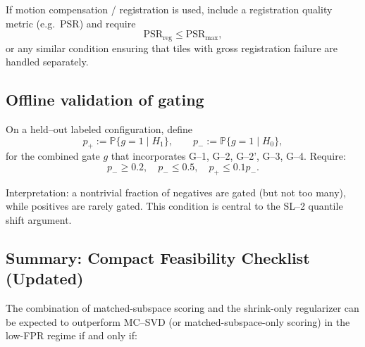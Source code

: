 \documentclass[11pt]{article}
\begin{document}
If motion compensation / registration is used, include a registration quality metric (e.g.\ PSR) and require
\[
\mathrm{PSR}_{\text{reg}}\le \text{PSR}_{\max},
\]
or any similar condition ensuring that tiles with gross registration failure are handled separately.

\subsection{Offline validation of gating}

On a held--out labeled configuration, define
\[
p_+ := \mathbb{P}\{g=1\mid H_1\},\qquad
p_- := \mathbb{P}\{g=1\mid H_0\},
\]
for the combined gate $g$ that incorporates G--1, G--2, G--2', G--3, G--4. Require:
\[
p_-\ge 0.2,\quad p_- \le 0.5,\quad p_+ \le 0.1 p_-.
\]

Interpretation: a nontrivial fraction of negatives are gated (but not too many), while positives are rarely gated. This condition is central to the SL--2 quantile shift argument.

\subsection{Summary: Compact Feasibility Checklist (Updated)}

The combination of matched-subspace scoring and the shrink-only regularizer can be expected to outperform MC--SVD (or matched-subspace-only scoring) in the low-FPR regime if and only if:
\end{document}
